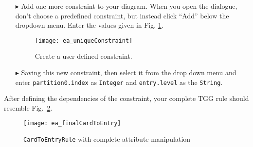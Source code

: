 \begin{enumerate}
\item[$\blacktriangleright$] Add one more constraint to your diagram. When you open the dialogue, don't choose a predefined constraint, but instead click
``Add'' below the dropdown menu. Enter the values given in Fig. \ref{fig:create_new_constraint}.

\vspace{0.5cm}

\begin{figure}[htbp]
\begin{center}
  \texttt{[image: ea\_uniqueConstraint]}
  \caption{Create a user defined constraint.}
  \label{fig:create_new_constraint}
\end{center}
\end{figure}
\FloatBarrier

\item[$\blacktriangleright$] Saving this new constraint, then select it from the drop down menu and enter \texttt{partition0.index} as \texttt{Integer} and
\texttt{entry.level} as the \texttt{String}.
\end{enumerate}

After defining the dependencies of the constraint, your complete TGG rule should resemble Fig.~\ref{fig:cardtoentry_complete}.

\newpage

\begin{figure}[htbp]
\begin{center}
  \texttt{[image: ea\_finalCardToEntry]}
  \caption{\texttt{CardToEntryRule} with complete attribute manipulation}
  \label{fig:cardtoentry_complete}
\end{center}
\end{figure}


